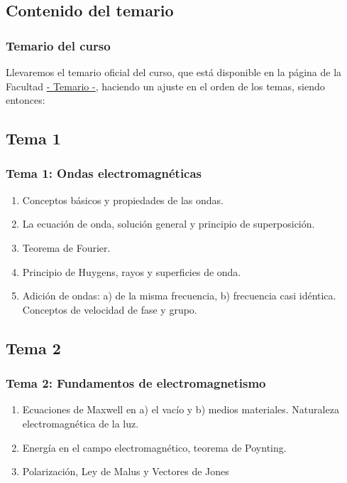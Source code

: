 \documentclass[12pt]{beamer}
\begin{document}
\subsection{Contenido del temario}

\begin{frame}
\frametitle{Temario del curso}
Llevaremos el temario oficial del curso, que está disponible en la página de la Facultad \href{https://www.fciencias.unam.mx/sites/default/files/temario/584.pdf}{- Temario -}, haciendo un ajuste en el orden de los temas, siendo entonces:
\end{frame}

\subsection*{Tema 1}

\begin{frame}
\frametitle{\textbf{Tema 1: Ondas electromagnéticas}}
\begin{enumerate}[<+->]
\item Conceptos básicos y propiedades de las ondas.
\item La ecuación de onda, solución general y principio de superposición.
\item Teorema de Fourier.
\item Principio de Huygens, rayos y superficies de onda.
\item Adición de ondas: a) de la misma frecuencia, b) frecuencia casi idéntica. Conceptos de velocidad de fase y grupo.
\end{enumerate}
\end{frame}

\subsection*{Tema 2}

\begin{frame}
\frametitle{\textbf{Tema 2: Fundamentos de electromagnetismo}}
\begin{enumerate}[<+->]
\item Ecuaciones de Maxwell en a) el vacío y b) medios materiales. Naturaleza electromagnética de
la luz.
\item Energía en el campo electromagnético, teorema de Poynting.
\item Polarización, Ley de Malus y Vectores de Jones
\end{enumerate}
\end{frame}
\end{document}
